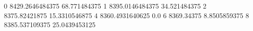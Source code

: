 0 8429.2646484375 68.771484375
1 8395.0146484375 34.521484375
2 8375.82421875 15.3310546875
4 8360.4931640625 0.0
6 8369.34375 8.8505859375
8 8385.537109375 25.0439453125
